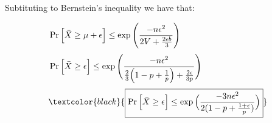 \documentclass{article}
\begin{document}
Subtituting to Bernstein's inequality we have that:

\begin{align*}
&\Pr\Big[\bar{X} \ge \mu + \epsilon \Big] 
\le \exp\Bigg( \frac{-n\epsilon^2}{2V + \frac{2\epsilon b}{3}} \Bigg) \\[1mm]
&\Pr\Big[\bar{X} \ge \epsilon \Big] 
\le \exp\Bigg( \frac{-n\epsilon^2}{\frac{2}{3}\Big(1-p+\frac{1}{p}\Big) + \frac{2\epsilon}{3p}} \Bigg) \\[1mm]
&\textcolor{black}{\boxed{\Pr\Big[\bar{X} \ge \epsilon \Big] \le \exp\Big( \frac{-3 n \epsilon^2}{2(1-p+\frac{1+\epsilon}{p})} \Big)}} 
\end{align*}
\end{document}
